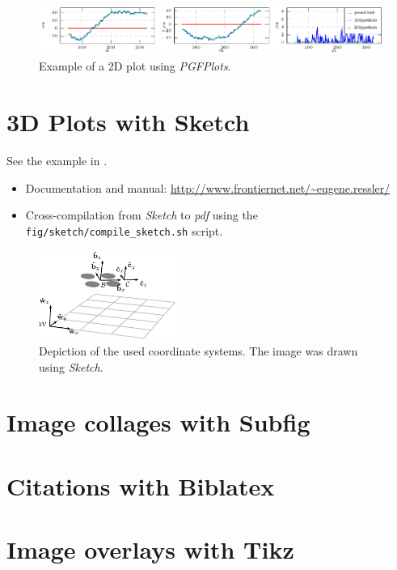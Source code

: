 \begin{figure}[!h]
  \centering
  \includegraphics[width=1.0\textwidth]{./fig/plots/example_plot/hypotheses.pdf}
  \caption{Example of a 2D plot using \emph{PGFPlots}.}
  \label{fig:pgfplots}
\end{figure}

\section{3D Plots with Sketch}

See the example in .

\begin{itemize}
  \item Documentation and manual: \url{http://www.frontiernet.net/~eugene.ressler/}
  \item Cross-compilation from \emph{Sketch} to \emph{pdf} using the \texttt{fig/sketch/compile\_sketch.sh} script.
\end{itemize}

\begin{figure}[!h]
  \centering
  \includegraphics[width=0.4\textwidth]{./fig/sketch/coordinate_frames.pdf}
  \caption{Depiction of the used coordinate systems. The image was drawn using \emph{Sketch}.}
  \label{fig:coordinate_systems}
\end{figure}

\section{Image collages with Subfig}

\section{Citations with Biblatex}

\section{Image overlays with Tikz}
